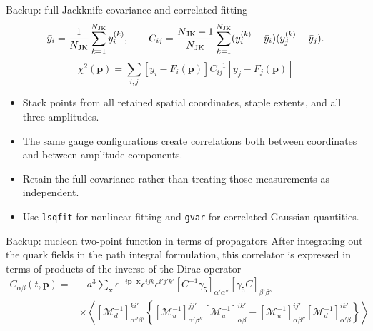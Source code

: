 \begin{frame}{Backup: full Jackknife covariance and correlated fitting}
\[
\bar y_i=\frac1{N_{\rm JK}}\sum_{k=1}^{N_{\rm JK}}y_i^{(k)},\qquad
C_{ij}=\frac{N_{\rm JK}-1}{N_{\rm JK}}\sum_{k=1}^{N_{\rm JK}}
(y_i^{(k)}-\bar y_i)(y_j^{(k)}-\bar y_j).
\]
\[
\boxed{\chi^2(\mathbf p)=\sum_{i,j}[\bar y_i-F_i(\mathbf p)]C^{-1}_{ij}[\bar y_j-F_j(\mathbf p)]}
\]
\begin{itemize}
\item Stack points from all retained spatial coordinates, staple extents, and all three amplitudes.
\item The same gauge configurations create correlations both between coordinates and between amplitude components.
\item Retain the full covariance rather than treating those measurements as independent.
\item Use \texttt{lsqfit} for nonlinear fitting and \texttt{gvar} for correlated Gaussian quantities.
\end{itemize}
\end{frame}

\begin{frame}{Backup: nucleon two-point function in terms of propagators}
  After integrating out the quark fields in the path integral formulation, this correlator is expressed in terms of products of the inverse of the Dirac operator
  {\small
  \begin{align*}
    C_{\alpha\beta}(t,\mathbf{p})=&-a^3\sum_{\mathbf{x}}e^{-i\mathbf{p}\cdot\mathbf{x}}\epsilon^{ijk}\epsilon^{i'j'k'}[C^{-1}\gamma_{5}]_{\alpha'\alpha''}[\gamma_{5}C]_{\beta'\beta''}\\
    &\times\left\langle[\mathcal{M}^{-1}_{d}]^{ki'}_{\alpha''\beta'}\left\{[\mathcal{M}^{-1}_{u}]^{jj'}_{\alpha'\beta''}[\mathcal{M}^{-1}_{u}]^{ik'}_{\alpha\beta}-[\mathcal{M}^{-1}_{u}]^{ij'}_{\alpha\beta''}[\mathcal{M}^{-1}_{d}]^{ik'}_{\alpha'\beta}\right\}\right\rangle
  \end{align*}}
\end{frame}

